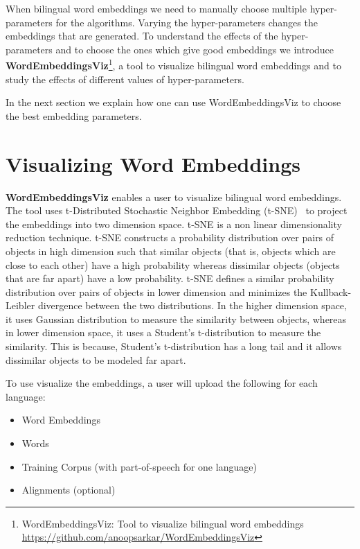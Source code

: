 When bilingual word embeddings we need to manually choose multiple hyper-parameters for the algorithms. Varying the hyper-parameters changes the embeddings that are generated. To understand the effects of the hyper-parameters and to choose the ones which give good embeddings we introduce \textbf{WordEmbeddingsViz}\footnote{WordEmbeddingsViz: Tool to visualize bilingual word embeddings \url{https://github.com/anoopsarkar/WordEmbeddingsViz}}, a tool to visualize bilingual word embeddings and to study the effects of different values of hyper-parameters.

In the next section we explain how one can use WordEmbeddingsViz to choose the best embedding parameters.

\section{Visualizing Word Embeddings} \label{WordEmbeddingsViz}

\textbf{WordEmbeddingsViz} enables a user to visualize bilingual word embeddings. The tool uses t-Distributed Stochastic Neighbor Embedding (t-SNE)~\cite{tSNE} to project the embeddings into two dimension space. t-SNE is a non linear dimensionality reduction technique. t-SNE constructs a probability distribution over pairs of objects in high dimension such that similar objects (that is, objects which are close to each other) have a high probability whereas dissimilar objects (objects that are far apart) have a low probability. t-SNE defines a similar probability distribution over pairs of objects in lower dimension and minimizes the Kullback-Leibler divergence between the two distributions. In the higher dimension space, it uses Gaussian distribution to measure the similarity between objects, whereas in lower dimension space, it uses a Student's t-distribution to measure the similarity. This is because, Student's t-distribution has a long tail and it allows dissimilar objects to be modeled far apart.

To use visualize the embeddings, a user will upload the following for each language:
\begin{itemize}
	\item Word Embeddings
	\item Words
	\item Training Corpus (with part-of-speech for one language)
	\item Alignments (optional)
\end{itemize}

